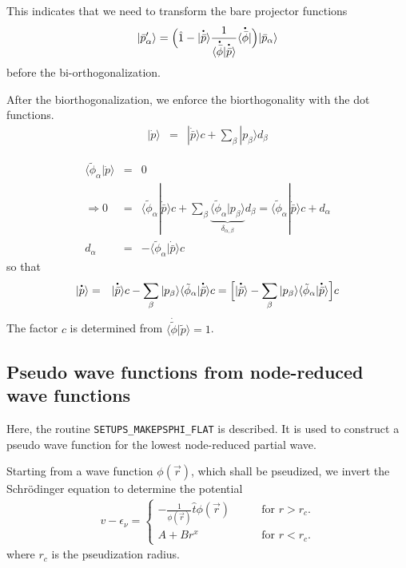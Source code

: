 \documentclass[11pt,a4paper]{report}
\begin{document}
This indicates that we need to transform the bare projector functions
\begin{eqnarray}
|\bar{p}'_\alpha\rangle=
\Bigl(\hat{1}
-|\dot{\bar{p}}\rangle 
\frac{1}{\langle\dot{\bar{\phi}}|\dot{\bar{p}}\rangle}
\langle\dot{\bar{\phi}}|\Bigr)
|\bar{p}_\alpha\rangle
\end{eqnarray}
before the bi-orthogonalization.

After the biorthogonalization, we enforce the biorthogonality with the
dot functions.
\begin{eqnarray}
|\dot{p}\rangle&=&|\dot{\bar{p}}\rangle c +\sum_\beta |p_\beta\rangle d_\beta
\end{eqnarray} 

\begin{eqnarray}
\langle\tilde{\phi}_\alpha|\dot{p}\rangle&=&0
\nonumber\\
\Rightarrow
0&=&\langle\tilde{\phi}_\alpha|\dot{\bar{p}}\rangle c 
+\sum_\beta \underbrace{\langle\tilde{\phi}_\alpha|p_\beta\rangle
}_{\delta_{\alpha,\beta}} d_\beta
=\langle\tilde{\phi}_\alpha|\dot{\bar{p}}\rangle c 
+d_\alpha
\nonumber\\
d_\alpha&=&-\langle\tilde{\phi}_\alpha|\dot{\bar{p}}\rangle c 
\end{eqnarray} 
so that
\begin{eqnarray}
|\dot{p}\rangle&=&
|\dot{\bar{p}}\rangle c -
\sum_\beta |p_\beta\rangle\langle\tilde{\phi}_\alpha|\dot{\bar{p}}\rangle c 
=\Bigl[|\dot{\bar{p}}\rangle -
\sum_\beta |p_\beta\rangle\langle\tilde{\phi}_\alpha|\dot{\bar{p}}\rangle\Bigr] c 
\end{eqnarray} 
The factor $c$ is determined from
$\langle\dot{\tilde{\phi}}|\tilde{p}\rangle=1$.


\subsection{Pseudo wave functions from node-reduced wave functions}
\label{sec:determinedeltepseudo}
Here, the routine \verb|SETUPS_MAKEPSPHI_FLAT| is described. It is used
to construct a pseudo wave function for the lowest node-reduced
partial wave.

Starting from a wave function $\phi(\vec{r})$, which shall be
pseudized, we invert the Schr\"odinger equation to determine the potential
\begin{eqnarray}
v-\epsilon_\nu=
\begin{cases}
-\frac{1}{\phi(\vec{r})}\hat{t}\phi(\vec{r})&\qquad\text{for $r>r_c$.}
\\
A+Br^x&\qquad\text{for $r<r_c$.}
\end{cases}
\label{eq:invertschrgl}
\end{eqnarray}
where $r_c$ is the pseudization radius. 
\end{document}
